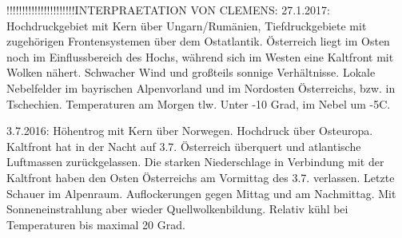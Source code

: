 !!!!!!!!!!!!!!!!!!!!!!INTERPRAETATION VON CLEMENS:
27.1.2017: 
Hochdruckgebiet mit Kern über Ungarn/Rumänien, Tiefdruckgebiete mit zugehörigen Frontensystemen über dem Ostatlantik. Österreich liegt im Osten noch im Einflussbereich des Hochs, während sich im Westen eine Kaltfront mit Wolken nähert. Schwacher Wind und großteils sonnige Verhältnisse. Lokale Nebelfelder im bayrischen Alpenvorland und im Nordosten Österreichs, bzw. in Tschechien. Temperaturen am Morgen tlw. Unter -10 Grad, im Nebel um -5C.

3.7.2016:
Höhentrog mit Kern über Norwegen. Hochdruck über Osteuropa. 
Kaltfront hat in der Nacht auf 3.7. Österreich überquert und atlantische Luftmassen zurückgelassen. Die starken Niederschlage in Verbindung mit der Kaltfront haben den Osten Österreichs am Vormittag des 3.7. verlassen. Letzte Schauer im Alpenraum. Auflockerungen gegen Mittag und am Nachmittag. Mit Sonneneinstrahlung aber wieder Quellwolkenbildung. Relativ kühl bei Temperaturen bis maximal 20 Grad.